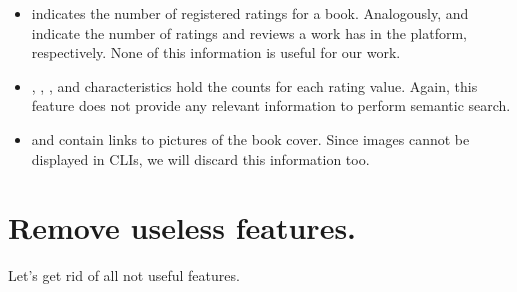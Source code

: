 \documentclass[letterpaper,10pt,english]{sphinxmanual}
\begin{document}
\begin{itemize}
\item {} 
 indicates the number of registered ratings for a book. Analogously,  and  indicate the number of ratings and reviews a work has in the platform, respectively. None of this information is useful for our work.

\item {} 
, , ,  and  characteristics hold the counts for each rating value. Again, this feature does not provide any relevant information to perform semantic search.

\item {} 
 and  contain links to pictures of the book cover. Since images cannot be displayed in CLIs, we will discard this information too.

\end{itemize}


\section{Remove useless features.}
\label{\detokenize{Data preprocessing:Remove-useless-features.}}
Let’s get rid of all not useful features.
\end{document}
